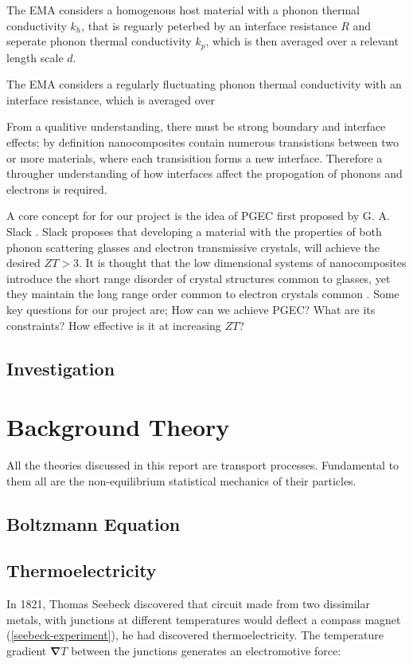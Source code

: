 \documentclass[12pt,draft]{article}
\renewcommand{\vec}[1]{\mathbf{#1}}
\begin{document}
The EMA considers a homogenous host material with a phonon thermal conductivity $k_h$, that is reguarly peterbed by an interface resistance $R$ and seperate phonon thermal conductivity $k_p$, which is then averaged over a relevant length scale $d$.

The EMA considers a regularly fluctuating phonon thermal conductivity with an interface resistance, which is averaged over 

From a qualitive understanding, there must be strong boundary and interface effects; by definition nanocomposites contain numerous transistions between two or more materials, where each transisition forms a new interface. Therefore a througher understanding of how interfaces affect the propogation of phonons and electrons is required.


A core concept for for our project is the idea of \ac{PGEC} first proposed by G. A. Slack \cite{crc-handbook}. Slack proposes that developing a material with the properties of both phonon scattering glasses and electron transmissive crystals, will achieve the desired $ZT > 3$. It is thought that the low dimensional systems of nanocomposites introduce the short range disorder of crystal structures common to glasses, yet they maintain the long range order common to electron crystals common \cite{crc-handbook}. Some key questions for our project are; How can we achieve \ac{PGEC}? What are its constraints? How effective is it at increasing $ZT$?


\subsection{Investigation}

\section{Background Theory}
All the theories discussed in this report are transport processes. Fundamental to them all are the non-equilibrium statistical mechanics of their particles.

\subsection{Boltzmann Equation}

\subsection{Thermoelectricity}
In 1821, Thomas Seebeck discovered that circuit made from two dissimilar metals, with junctions at different temperatures would deflect a compass magnet (\ref{seebeck-experiment}), he had discovered thermoelectricity. The temperature gradient $\vec{\nabla} T$ between the junctions generates an electromotive force:
\end{document}
